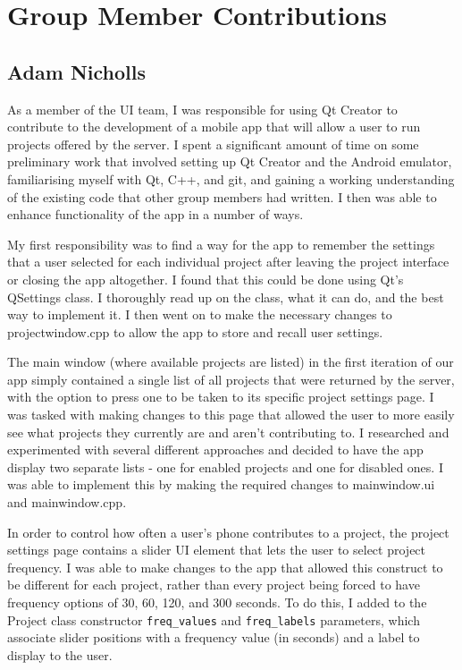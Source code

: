 \documentclass{article}
\begin{document}
\section{Group Member Contributions}
\subsection{Adam Nicholls}
As a member of the UI team, I was responsible for using Qt Creator to contribute to the development of a mobile app that will allow a user to
run projects offered by the server. I spent a significant amount of time on some preliminary work that involved setting up Qt Creator and the
Android emulator, familiarising myself with Qt, C++, and git, and gaining a working understanding of the existing code that other group members
had written. I then was able to enhance functionality of the app in a number of ways.

My first responsibility was to find a way for the app to remember the settings that a user selected for each individual project after leaving
the project interface or closing the app altogether. I found that this could be done using Qt’s QSettings class. I thoroughly read up on the
class, what it can do, and the best way to implement it. I then went on to make the necessary changes to projectwindow.cpp to allow the app
to store and recall user settings.

The main window (where available projects are listed) in the first iteration of our app simply contained a single list of all projects that
were returned by the server, with the option to press one to be taken to its specific project settings page. I was tasked with making changes
to this page that allowed the user to more easily see what projects they currently are and aren't contributing to. I researched and experimented
with several different approaches and decided to have the app display two separate lists - one for enabled projects and one for disabled ones.
I was able to implement this by making the required changes to mainwindow.ui and mainwindow.cpp.

In order to control how often a user’s phone contributes to a project, the project settings page contains a slider UI element that lets the user
to select project frequency. I was able to make changes to the app that allowed this construct to be different for each project, rather than
every project being forced to have frequency options of 30, 60, 120, and 300 seconds. To do this, I added to the Project class constructor
\texttt{freq\_values} and \texttt{freq\_labels} parameters, which associate slider positions with a frequency value (in seconds) and a label
to display to the user.
\end{document}
